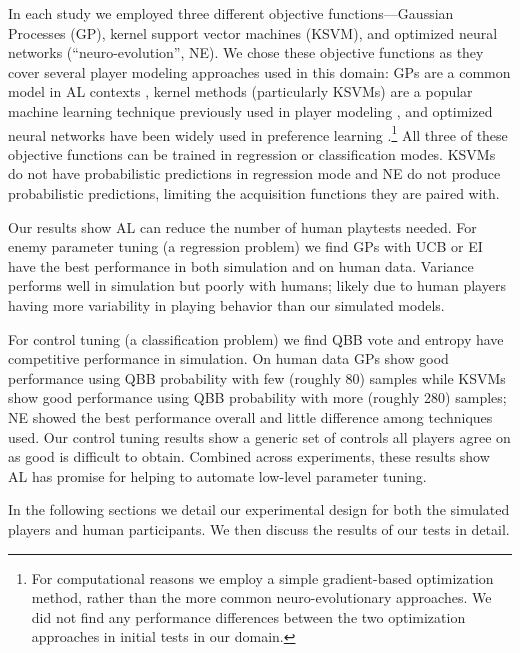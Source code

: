 \documentclass{sig-alternate}
\begin{document}
In each study we employed three different objective functions---Gaussian Processes (GP), kernel support vector machines (KSVM), and optimized neural networks (``neuro-evolution'', NE).
We chose these objective functions as they cover several player modeling approaches used in this domain: GPs are a common model in AL contexts \cite{brochu2010:thesis}, kernel methods (particularly KSVMs) are a popular machine learning technique previously used in player modeling \cite{yu2011:minboredom}, and optimized neural networks have been widely used in preference learning \cite{yannakakis2011:edpcg}.\footnote{For computational reasons we employ a simple gradient-based optimization method, rather than the more common neuro-evolutionary approaches. We did not find any performance differences between the two optimization approaches in initial tests in our domain.}
All three of these objective functions can be trained in regression or classification modes.
KSVMs do not have probabilistic predictions in regression mode and NE do not produce probabilistic predictions, limiting the acquisition functions they are paired with.

Our results show AL can reduce the number of human playtests needed.
For enemy parameter tuning (a regression problem) we find GPs with UCB or EI have the best performance in both simulation and on human data.
Variance performs well in simulation but poorly with humans; likely due to human players having more variability in playing behavior than our simulated models.

For control tuning (a classification problem) we find QBB vote and entropy have competitive performance in simulation.
On human data GPs show good performance using QBB probability with few (roughly 80) samples while KSVMs show good performance using QBB probability with more (roughly 280) samples; NE showed the best performance overall and little difference among techniques used.
Our control tuning results show a generic set of controls all players agree on as good is difficult to obtain.
Combined across experiments, these results show AL has promise for helping to automate low-level parameter tuning.

In the following sections we detail our experimental design for both the simulated players and human participants.
We then discuss the results of our tests in detail.


%
\end{document}
